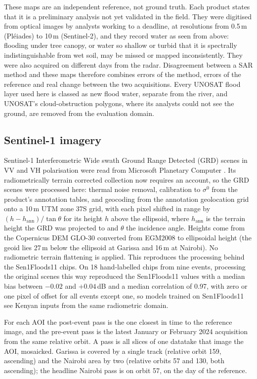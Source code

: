 \documentclass[11pt]{article}
\begin{document}
These maps are an independent reference, not ground truth. Each product
states that it is a preliminary analysis not yet validated in the field. They
were digitised from optical images by analysts working to a deadline, at
resolutions from 0.5\,m (Pléiades) to 10\,m (Sentinel-2), and they record
water as seen from above: flooding under tree canopy, or water so shallow or
turbid that it is spectrally indistinguishable from wet soil, may be missed or
mapped inconsistently. They were also acquired on different days from the
radar. Disagreement between a SAR method and these maps therefore combines
errors of the method, errors of the reference and real change between the
two acquisitions. Every UNOSAT flood layer used here is classed as new flood
water, separate from the river, and UNOSAT's cloud-obstruction polygons,
where its analysts could not see the ground, are removed from the evaluation
domain.

\subsection{Sentinel-1 imagery}

Sentinel-1 Interferometric Wide swath Ground Range Detected (GRD) scenes in VV
and VH polarisation were read from Microsoft Planetary Computer
\cite{planetary2022}. Its radiometrically terrain corrected collection now
requires an account, so the GRD scenes were processed here: thermal noise
removal, calibration to $\sigma^0$ from the product's annotation tables, and
geocoding from the annotation geolocation grid onto a 10\,m UTM zone 37S grid,
with each pixel shifted in range by $(h - h_\mathrm{ann})/\tan\theta$ for its
height $h$ above the ellipsoid, where $h_\mathrm{ann}$ is the terrain height
the GRD was projected to and $\theta$ the incidence angle. Heights come from
the Copernicus DEM GLO-30 \cite{copdem} converted from EGM2008 to ellipsoidal
height (the geoid lies 27\,m below the ellipsoid at Garissa and 16\,m at
Nairobi). No radiometric terrain flattening is applied. This reproduces the
processing behind the Sen1Floods11 chips. On 18 hand-labelled chips from nine
events, processing the original scenes this way reproduced the Sen1Floods11
values with a median bias between $-0.02$ and $+0.04$\,dB and a median
correlation of 0.97, with zero or one pixel of offset for all events except
one, so models trained on Sen1Floods11 see Kenyan inputs from the same
radiometric domain.

For each AOI the post-event pass is the one closest in time to the reference
image, and the pre-event pass is the latest January or February 2024
acquisition from the same relative orbit. A pass is all slices of one
datatake that image the AOI, mosaicked. Garissa is covered by a single track
(relative orbit 159, ascending) and the Nairobi area by two (relative orbits
57 and 130, both ascending); the headline Nairobi pass is on orbit 57, on the
day of the reference.
\end{document}
